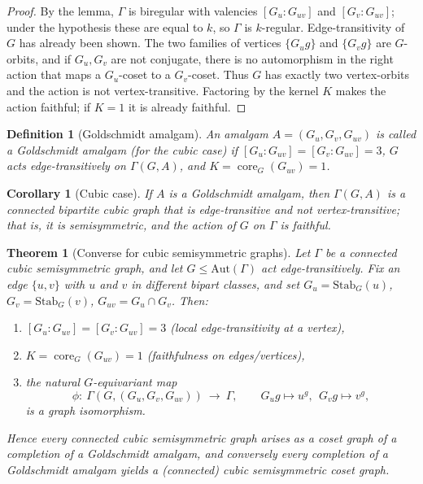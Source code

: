 \documentclass[12pt,a4paper,openany]{book}
\newtheorem{theorem}{Theorem}[section]
\newtheorem{definition}{Definition}[section]
\newtheorem{corollary}{Corollary}[section]
\begin{document}
\begin{proof}
By the lemma, $\Gamma$ is biregular with valencies $[G_u:G_{uv}]$ and $[G_v:G_{uv}]$;
under the hypothesis these are equal to $k$, so $\Gamma$ is $k$-regular.
Edge-transitivity of $G$ has already been shown. The two families of vertices
$\{G_u g\}$ and $\{G_v g\}$ are $G$-orbits, and if $G_u,G_v$ are not conjugate,
there is no automorphism in the right action that maps a $G_u$-coset to a $G_v$-coset.
Thus $G$ has exactly two vertex-orbits and the action is not vertex-transitive.
Factoring by the kernel $K$ makes the action faithful; if $K=1$ it is already faithful.
\end{proof}

\begin{definition}[Goldschmidt amalgam]
An amalgam $A=(G_u,G_v,G_{uv})$ is called a \emph{Goldschmidt amalgam} (for the
cubic case) if $[G_u:G_{uv}]=[G_v:G_{uv}]=3$, $G$ acts edge-transitively on
$\Gamma(G,A)$, and $K=\operatorname{core}_G(G_{uv})=1$.
\end{definition}

\begin{corollary}[Cubic case]
If $A$ is a Goldschmidt amalgam, then $\Gamma(G,A)$ is a connected bipartite
cubic graph that is edge-transitive and not vertex-transitive; that is, it is
\emph{semisymmetric}, and the action of $G$ on $\Gamma$ is faithful.
\end{corollary}

\begin{theorem}[Converse for cubic semisymmetric graphs]\label{thm:converse}
Let $\Gamma$ be a connected cubic semisymmetric graph, and let $G\le \mathrm{Aut}(\Gamma)$
act edge-transitively. Fix an edge $\{u,v\}$ with $u$ and $v$ in different bipart
classes, and set $G_u=\mathrm{Stab}_G(u)$, $G_v=\mathrm{Stab}_G(v)$, $G_{uv}=G_u\cap G_v$.
Then:
\begin{enumerate}
\item $[G_u:G_{uv}]=[G_v:G_{uv}]=3$ (local edge-transitivity at a vertex),
\item $K=\operatorname{core}_G(G_{uv})=1$ (faithfulness on edges/vertices),
\item the natural $G$-equivariant map
\[
\phi:\ \Gamma(G,(G_u,G_v,G_{uv}))\ \longrightarrow\ \Gamma,\qquad
G_u g\mapsto u^g,\ \ G_v g\mapsto v^g,
\]
is a graph isomorphism.
\end{enumerate}
Hence every connected cubic semisymmetric graph arises as a coset graph
of a completion of a Goldschmidt amalgam, and conversely every completion
of a Goldschmidt amalgam yields a (connected) cubic semisymmetric coset graph.
\end{theorem}
\end{document}
